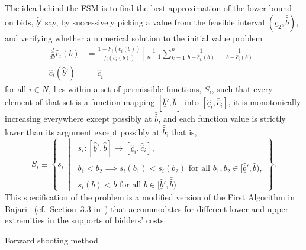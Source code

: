 The idea behind the FSM is to find the best approximation of the lower bound on bids, $\underline{\hat{b}}'$ say, by successively picking a value from the feasible interval $(\underline{\hat{c}}_2, \bar{\hat{b}})$, and verifying whether a numerical solution to the initial value problem
\begin{equation}
  \label{eq:fsm_initial_value_problem_indirect}
  \begin{array}{ll}
    \displaystyle\frac{d}{db}\hat{c}_i(b) &= \displaystyle\frac{1 - F_i(\hat{c}_i(b))}{f_i(\hat{c}_i(b))}\left[ \frac{1}{n-1}\sum_{k=1}^n\frac{1}{b - \hat{c}_k(b)} - \frac{1}{b - \hat{c}_i(b)} \right] \\[2ex]
    \hat{c}_i(\underline{\hat{b}}') &= \underline{\hat{c}}_i
  \end{array}
\end{equation}
for all $i\in N$, lies within a set of permissible functions, $S_i$, such that every element of that set is a function mapping $[\underline{\hat{b}}', \bar{\hat{b}}]$ into $[\underline{\hat{c}}_i, \bar{\hat{c}}_i]$, it is monotonically increasing everywhere except possibly at $\bar{\hat{b}}$, and each function value is strictly lower than its argument except possibly at $\bar{\hat{b}}$; that is,
\begin{equation*}
  S_i\equiv\left\{s_i \:\middle\vert\:
  \begin{array}{l}
    s_i: [\underline{\hat{b}}', \bar{\hat{b}}]\to [\underline{\hat{c}}_i, \bar{\hat{c}}_i],\\
    b_1 < b_2\implies s_i(b_1) < s_i(b_2) \textrm{ for all }b_1,b_2\in [\underline{\hat{b}}', \bar{\hat{b}}),\\
    s_i(b) < b \textrm{ for all }b\in [\underline{\hat{b}}', \bar{\hat{b}})
  \end{array}
  \right\}.
\end{equation*}
This specification of the problem is a modified version of the First Algorithm in Bajari~\cite{Bajari2001a} (cf.~Section~3.3 in~\cite{Bajari2001a}) that accommodates for different lower and upper extremities in the supports of bidders' costs.

\begin{algorithm}
\caption{Forward shooting method}
\label{alg:forward_shooting_method_indirect}
\begin{algorithmic}[1]
  \Statex
  \Statex
    \Let{$bids$}{$[guess, \bar{\hat{b}})$}
    \Else
    \EndIf
  \EndWhile
  \Statex
\end{algorithmic}
\end{algorithm}

